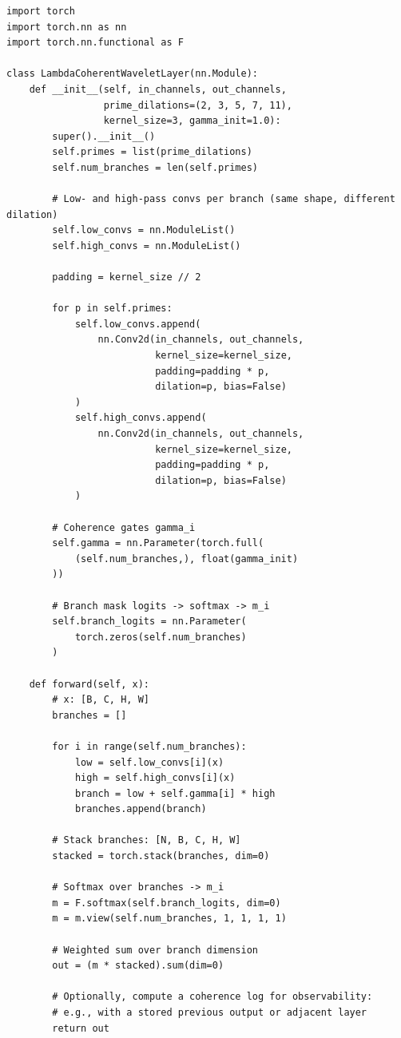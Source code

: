 \documentclass[11pt]{article}
\begin{document}
\begin{verbatim}
import torch
import torch.nn as nn
import torch.nn.functional as F

class LambdaCoherentWaveletLayer(nn.Module):
    def __init__(self, in_channels, out_channels,
                 prime_dilations=(2, 3, 5, 7, 11),
                 kernel_size=3, gamma_init=1.0):
        super().__init__()
        self.primes = list(prime_dilations)
        self.num_branches = len(self.primes)

        # Low- and high-pass convs per branch (same shape, different dilation)
        self.low_convs = nn.ModuleList()
        self.high_convs = nn.ModuleList()

        padding = kernel_size // 2

        for p in self.primes:
            self.low_convs.append(
                nn.Conv2d(in_channels, out_channels,
                          kernel_size=kernel_size,
                          padding=padding * p,
                          dilation=p, bias=False)
            )
            self.high_convs.append(
                nn.Conv2d(in_channels, out_channels,
                          kernel_size=kernel_size,
                          padding=padding * p,
                          dilation=p, bias=False)
            )

        # Coherence gates gamma_i
        self.gamma = nn.Parameter(torch.full(
            (self.num_branches,), float(gamma_init)
        ))

        # Branch mask logits -> softmax -> m_i
        self.branch_logits = nn.Parameter(
            torch.zeros(self.num_branches)
        )

    def forward(self, x):
        # x: [B, C, H, W]
        branches = []

        for i in range(self.num_branches):
            low = self.low_convs[i](x)
            high = self.high_convs[i](x)
            branch = low + self.gamma[i] * high
            branches.append(branch)

        # Stack branches: [N, B, C, H, W]
        stacked = torch.stack(branches, dim=0)

        # Softmax over branches -> m_i
        m = F.softmax(self.branch_logits, dim=0)
        m = m.view(self.num_branches, 1, 1, 1, 1)

        # Weighted sum over branch dimension
        out = (m * stacked).sum(dim=0)

        # Optionally, compute a coherence log for observability:
        # e.g., with a stored previous output or adjacent layer
        return out
\end{verbatim}
\end{document}
